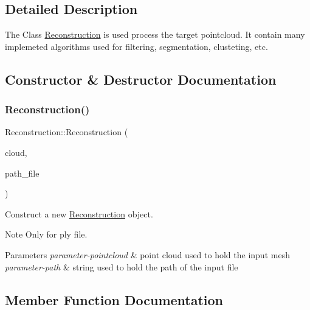 \subsection{Detailed Description}
The Class \hyperlink{classReconstruction}{Reconstruction} is used process the target pointcloud. It contain many implemeted algorithms used for filtering, segmentation, clusteting, etc. 

\subsection{Constructor \& Destructor Documentation}
\mbox{\label{classReconstruction_ac7ac62559b5825dcec2a760946897f40}} 
\subsubsection{\texorpdfstring{Reconstruction()}{Reconstruction()}}
{\footnotesize\ttfamily Reconstruction\+::\+Reconstruction (\begin{DoxyParamCaption}\item[{pcl\+::\+Point\+Cloud$<$ pcl\+::\+Point\+X\+Y\+Z\+R\+G\+B\+Normal $>$\+::Ptr \&}]{cloud,  }\item[{std\+::string}]{path\+\_\+file }\end{DoxyParamCaption})}



Construct a new \hyperlink{classReconstruction}{Reconstruction} object. 

\begin{DoxyNote}{Note}
Only for ply file. 
\end{DoxyNote}

\begin{DoxyParams}{Parameters}
{\em parameter-\/pointcloud} & point cloud used to hold the input mesh \\
\hline
{\em parameter-\/path} & string used to hold the path of the input file \\
\hline
\end{DoxyParams}


\subsection{Member Function Documentation}
\mbox{\label{classReconstruction_aa26b3c0a0b3739c330b2c48f874c15c9}} 
